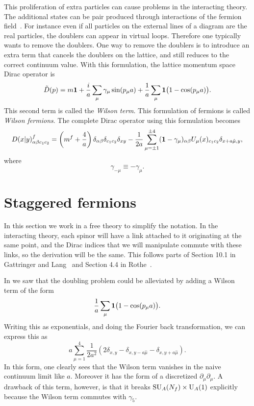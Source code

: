 This proliferation of extra particles can cause problems in the
interacting theory. The additional states can be pair produced
through interactions of the fermion field~\cite{montvay_quantum_1994}.
For instance even if all particles on the external lines of a diagram
are the real particles, the doublers can appear in virtual loops.
Therefore one typically wants to remove the doublers.
One way to remove the doublers is to introduce an extra term that
cancels the doublers on the lattice, and still reduces to the
correct continuum value. With this formulation, the lattice
momentum space Dirac operator is
\begin{equation}
  \tilde{D}(p)=m{\mathbf 1}+\frac{i}{a}\sum_\mu\gamma_\mu\sin(p_\mu a)
                   +\frac{1}{a}\sum_\mu{\mathbf 1}\big(1-\cos(p_\mu a)\big).
\end{equation} 
This second term is called the {\it Wilson term}. This formulation
of fermions is called {\it Wilson fermions}. The complete Dirac
operator using this formulation becomes 
\begin{equation}
  D(x|y)^f_{\alpha\beta c_1c_2}
  =\left(m^f+\frac{4}{a}\right)\delta_{\alpha\beta}
                               \delta_{c_1c_2}
                               \delta_{xy}
   -\frac{1}{2a}\sum_{\mu=\pm 1}^{\pm 4}({\mathbf 1}-\gamma_\mu)_{\alpha\beta}
      U_\mu(x)_{c_1 c_2}\delta_{x+a\hat{\mu},y},
\end{equation}
where
\begin{equation}
  \gamma_{-\mu}\equiv-\gamma_{\mu}.
\end{equation}

\section{Staggered fermions}

In this section we work in a free theory to simplify the notation.
In the interacting theory, each spinor will have a link attached to it
originating at the same point, and the Dirac indices that we will
manipulate commute with these links, so the derivation will be the same.
This follows parts of Section 10.1 in Gattringer and
Lang~\cite{gattringer_quantum_2010} and Section 4.4 in
Rothe~\cite{rothe_lattice_2005}.

In  we saw that the doubling problem could
be alleviated by adding a Wilson term of the form
\begin{equation}
  \frac{1}{a}\sum_\mu{\mathbf 1}\big(1-\cos(p_\mu a)\big).
\end{equation}
Writing this as exponentials, and doing the Fourier back transformation,
we can express this as
\begin{equation}
  a\sum_{\mu=1}^4\frac{1}{2a^2}
\left(2\delta_{x,y}-\delta_{x,y-a\hat{\mu}}-\delta_{x,y+a\hat{\mu}}\right).
\end{equation}
In this form, one clearly sees that the Wilson term vanishes in the
naive continuum limit like $a$. Moreover it has the form of a
discretized $\partial_\mu\partial_\mu$. A drawback of this term,
however, is that it breaks $\operatorname{SU}_A(N_f)\times\operatorname{U}_A(1)$ explicitly
because the Wilson term commutes with $\gamma_5$.

